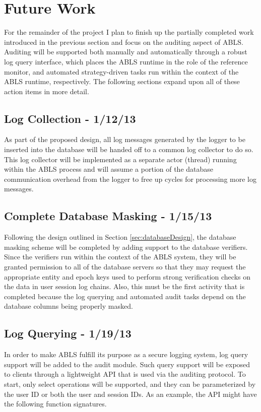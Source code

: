 \documentclass{sig-alternate}
\begin{document}
\section{Future Work}
For the remainder of the project I plan to finish up the partially completed work introduced in the previous section and 
focus on the auditing aspect of ABLS. Auditing will be supported both manually and automatically through
a robust log query interface, which places the ABLS runtime in the role of the reference monitor, and automated
strategy-driven tasks run within the context of the ABLS runtime, respectively. The following sections expand upon all
of these action items in more detail.

\subsection{Log Collection - 1/12/13}
As part of the proposed design, all log messages generated by the logger to be inserted into the 
database will be handed off to a common log collector to do so. This log collector will be implemented as a 
separate actor (thread) running within the ABLS process and will assume a portion of the database 
communication overhead from the logger to free up cycles for processing more log messages. 

\subsection{Complete Database Masking - 1/15/13}
Following the design outlined in Section \ref{sec:databaseDesign}, the database masking scheme will be completed by
adding support to the database verifiers. Since the verifiers run within the context of the ABLS system, they will be granted
permission to all of the database servers so that they may request the appropriate entity and epoch keys used to perform
strong verification checks on the data in user session log chains. Also, this must be the first activity that is completed 
because the log querying and automated audit tasks depend on the database columns being properly masked. 

\subsection{Log Querying - 1/19/13}
\label{sec:querying}
In order to make ABLS fulfill its purpose as a secure logging system, log query support will be added to the audit
module. Such query support will be exposed to clients through a lightweight API that is used via the auditing protocol.
To start, only select operations will be supported, and they can be parameterized by the user ID or both the user and 
session IDs. As an example, the API might have the following function signatures. \\
\end{document}
